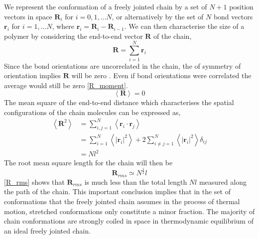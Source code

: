 We represent the conformation of a freely jointed chain by a set of $N+1$  position vectors in space ${\mathbf{R}_{i}}$ for $i=0,1,...N$, or alternatively by the set of $N$ bond vectors ${\mathbf{r}_{i}}$ for $i=1,...N$, where $\mathbf{r}_{i}=\mathbf{R}_{i}-\mathbf{R}_{i-1}$.  We can then characterise the size of a polymer by considering the end-to-end vector $\mathbf{R}$ of the chain,
%
\begin{equation}
\mathbf{R}= \sum_{i=1}^{N}\mathbf{r}_{i}
\end{equation}
%
Since the bond orientations are uncorrelated in the chain, the of symmetry of orientation implies $\mathbf{R}$ will be zero \cite{Flory1971}. Even if bond orientations were correlated the average would still be zero \eqref{R_moment}.
%
\begin{equation}
\label{R_moment}
\left\langle\mathbf{R}\right\rangle = 0
\end{equation}
%
The mean square of the end-to-end distance which characterises the spatial configurations of the chain molecules can be expressed as,
%
\begin{align}
\left\langle\mathbf{R}^{2}\right\rangle &= \sum_{i,j=1}^{N}\left\langle \mathbf{r}_{i}\cdot \mathbf{r}_{j}\right\rangle \\
&=\sum_{i=1}^{N}\left\langle |\mathbf{r}_{i}|^{2} \right\rangle + 2\sum_{i \neq j=1}^{N} \left\langle |\mathbf{r}_{i}|^{2}\right\rangle \delta_{ij} \\
&= Nl^{2} \label{R2_moment}
\end{align}
%
The root mean square length for the chain will then be 
%
\begin{equation}
\label{R_rms}
\mathbf{R}_{rms} \simeq N^{\frac{1}{2}}l
\end{equation}
%
\eqref{R_rms} shows that $\mathbf{R}_{rms}$ is much less than the total length $Nl$ measured along the path of the chain. This important conclusion implies that in the set of conformations that the freely jointed chain assumes in the process of thermal motion, stretched conformations only constitute a minor fraction. The majority of chain conformations are strongly coiled in space in thermodynamic equilibrium of an ideal freely jointed chain.

